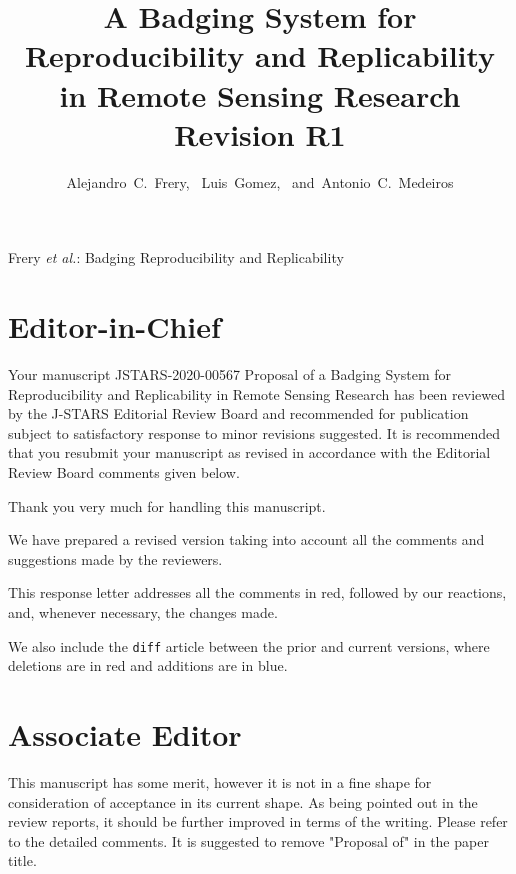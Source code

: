 \documentclass[journal,onecolumn,draftcls,12pt]{IEEEtran}
\begin{document}
\title{A Badging System for Reproducibility and Replicability in Remote Sensing Research\\
	Revision R1}

\author{Alejandro~C.~Frery,~
	Luis~Gomez,~
	and~Antonio~C.~Medeiros}

%
{Frery \MakeLowercase{\textit{et al.}}: Badging Reproducibility and Replicability}

\maketitle

\IEEEpeerreviewmaketitle

\section{Editor-in-Chief}
\begin{tcolorbox}[colback=red!5!white,colframe=red!75!black,title=Comment \#1]
Your manuscript JSTARS-2020-00567 Proposal of a Badging System for Reproducibility and Replicability in Remote Sensing Research has been reviewed by the J-STARS Editorial Review Board and recommended for publication subject to satisfactory response to minor revisions suggested. It is recommended that you resubmit your manuscript as revised in accordance with the Editorial Review Board comments given below.
\end{tcolorbox}

Thank you very much for handling this manuscript.

We have prepared a revised version taking into account all the comments and suggestions made by the reviewers.

This response letter addresses all the comments in red, followed by
our reactions, and, whenever necessary, the changes made.

We also include the \texttt{diff} article between the prior and current versions, where deletions are in red and additions are in blue.

\section{Associate Editor}

\begin{tcolorbox}[colback=red!5!white,colframe=red!75!black,title=Comment \#1]
This manuscript has some merit, however it is not in a fine shape for consideration of acceptance in its current shape. As being pointed out in the review reports, it should be further improved in terms of the writing. Please refer to the detailed comments. It is suggested to remove "Proposal of" in the paper title.
\end{tcolorbox}
\end{document}
